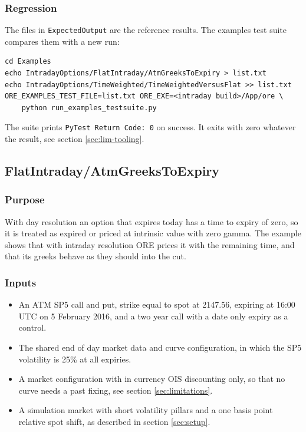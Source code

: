 \documentclass[12pt, a4paper]{article}
\begin{document}
\subsubsection*{Regression}

The files in \texttt{ExpectedOutput} are the reference results. The examples test suite compares them with a new run:

\begin{verbatim}
cd Examples
echo IntradayOptions/FlatIntraday/AtmGreeksToExpiry > list.txt
echo IntradayOptions/TimeWeighted/TimeWeightedVersusFlat >> list.txt
ORE_EXAMPLES_TEST_FILE=list.txt ORE_EXE=<intraday build>/App/ore \
    python run_examples_testsuite.py
\end{verbatim}

The suite prints \texttt{PyTest Return Code: 0} on success. It exits with zero whatever the result, see section
\ref{sec:lim-tooling}.

\subsection{FlatIntraday/AtmGreeksToExpiry}\label{sec:ex-atm}

\subsubsection*{Purpose}

With day resolution an option that expires today has a time to expiry of zero, so it is treated as expired or priced
at intrinsic value with zero gamma. The example shows that with intraday resolution ORE prices it with the remaining
time, and that its greeks behave as they should into the cut.

\subsubsection*{Inputs}

\begin{itemize}
\item An ATM SP5 call and put, strike equal to spot at 2147.56, expiring at 16:00 UTC on 5 February 2016, and a two
  year call with a date only expiry as a control.
\item The shared end of day market data and curve configuration, in which the SP5 volatility is 25\% at all expiries.
\item A market configuration with in currency OIS discounting only, so that no curve needs a past fixing, see section
  \ref{sec:limitations}.
\item A simulation market with short volatility pillars and a one basis point relative spot shift, as described in
  section \ref{sec:setup}.
\end{itemize}
\end{document}
